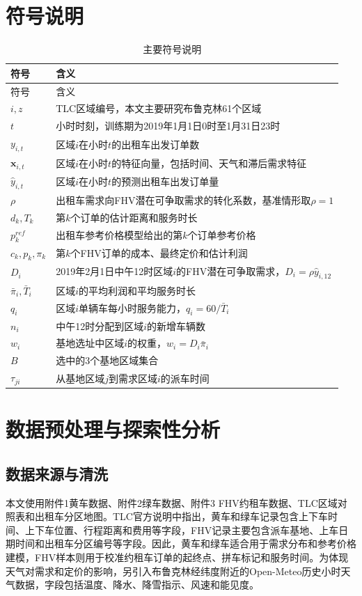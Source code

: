 \documentclass[UTF8,a4paper,12pt]{ctexart}
\begin{document}
\clearpage
\section{符号说明}
\begin{longtable}{p{}p{}}
\caption{主要符号说明}\label{tab:symbols}\\
\toprule
符号 & 含义 \\
\midrule
\endfirsthead
\toprule
符号 & 含义 \\
\midrule
\endhead
$i,z$ & TLC区域编号，本文主要研究布鲁克林61个区域 \\
$t$ & 小时时刻，训练期为2019年1月1日0时至1月31日23时 \\
$y_{i,t}$ & 区域$i$在小时$t$的出租车出发订单数 \\
$\bm{x}_{i,t}$ & 区域$i$在小时$t$的特征向量，包括时间、天气和滞后需求特征 \\
$\hat{y}_{i,t}$ & 区域$i$在小时$t$的预测出租车出发订单量 \\
$\rho$ & 出租车需求向FHV潜在可争取需求的转化系数，基准情形取$\rho=1$ \\
$d_k,T_k$ & 第$k$个订单的估计距离和服务时长 \\
$p_{k}^{ref}$ & 出租车参考价格模型给出的第$k$个订单参考价格 \\
$c_k,p_k,\pi_k$ & 第$k$个FHV订单的成本、最终定价和估计利润 \\
$D_i$ & 2019年2月1日中午12时区域$i$的FHV潜在可争取需求，$D_i=\rho\hat{y}_{i,12}$ \\
$\bar{\pi}_i,\bar{T}_i$ & 区域$i$的平均利润和平均服务时长 \\
$q_i$ & 区域$i$单辆车每小时服务能力，$q_i=60/\bar{T}_i$ \\
$n_i$ & 中午12时分配到区域$i$的新增车辆数 \\
$w_i$ & 基地选址中区域$i$的权重，$w_i=D_i\bar{\pi}_i$ \\
$B$ & 选中的3个基地区域集合 \\
$\tau_{ji}$ & 从基地区域$j$到需求区域$i$的派车时间 \\
\bottomrule
\end{longtable}
\clearpage
\section{数据预处理与探索性分析}

\subsection{数据来源与清洗}
本文使用附件1黄车数据、附件2绿车数据、附件3 FHV约租车数据、TLC区域对照表和出租车分区地图。TLC官方说明中指出，黄车和绿车记录包含上下车时间、上下车位置、行程距离和费用等字段，FHV记录主要包含派车基地、上车日期时间和出租车分区编号等字段\cite{tlcdata}。因此，黄车和绿车适合用于需求分布和参考价格建模，FHV样本则用于校准约租车订单的起终点、拼车标记和服务时间。为体现天气对需求和定价的影响，另引入布鲁克林经纬度附近的Open-Meteo历史小时天气数据\cite{openmeteo}，字段包括温度、降水、降雪指示、风速和能见度。
\end{document}

